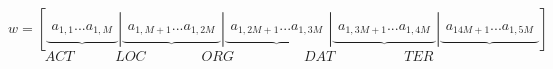 \mathleft
\begin{equation}
w=\left[ \underbrace { \begin{matrix}{ a }_{ 1,1 } ... { a }_{ 1,M } \end{matrix} } |\underbrace { \begin{matrix}{ a }_{ 1,M+1 } ... { a }_{ 1,2M } \end{matrix} } |\underbrace { \begin{matrix}{ a }_{ 1,2M+1 } ... { a }_{ 1,3M } \end{matrix} } |\underbrace { \begin{matrix}{ a }_{ 1,3M+1 } ... { a }_{ 1,4M } \end{matrix} } |\underbrace { \begin{matrix}{ a }_{ 14M+1 } ... { a }_{ 1,5M } \end{matrix} }  \right] 
\label{eq:concat_vec}
\end{equation}
$$ \quad  ACT \quad  \qquad  LOC\qquad \qquad ORG\qquad \quad \qquad DAT\qquad \quad  \qquad  TER\qquad \qquad$$
\mathcenter
\\
